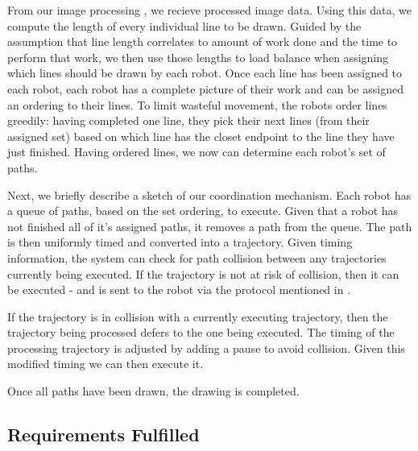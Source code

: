 From our image processing , we recieve processed image data.
Using this data, we compute the length of every individual line to be drawn.
Guided by the assumption that line length correlates to amount of work done and the time to perform that work, we then use those lengths to load balance when assigning which lines should be drawn by each robot.
Once each line has been assigned to each robot, each robot has a complete picture of their work and can be assigned an ordering to their lines.
To limit wasteful movement, the robots order lines greedily: having completed one line, they pick their next lines (from their assigned set) based on which line has the closet endpoint to the line they have just finished.
Having ordered lines, we now can determine each robot's set of paths.

Next, we briefly describe a sketch of our coordination mechanism. Each robot has a queue of paths, based on the set ordering, to execute.
Given that a robot has not finished all of it's assigned paths, it removes a path from the queue.
The path is then uniformly timed and converted into a trajectory.
Given timing information, the system can check for path collision between any trajectories currently being executed.
If the trajectory is not at risk of collision, then it can be executed - and is sent to the robot via the protocol mentioned in .

If the trajectory is in collision with a currently executing trajectory, then the trajectory being processed defers to the one being executed.
The timing of the processing trajectory is adjusted by adding a pause to avoid collision. Given this modified timing we can then execute it.

Once all paths have been drawn, the drawing is completed.

\subsection{Requirements Fulfilled}

